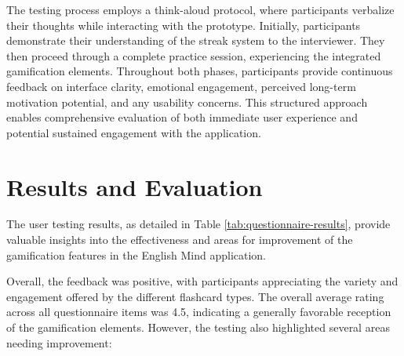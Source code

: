 The testing process employs a think-aloud protocol, where participants verbalize their thoughts while interacting with the prototype. Initially, participants demonstrate their understanding of the streak system to the interviewer. They then proceed through a complete practice session, experiencing the integrated gamification elements. Throughout both phases, participants provide continuous feedback on interface clarity, emotional engagement, perceived long-term motivation potential, and any usability concerns. This structured approach enables comprehensive evaluation of both immediate user experience and potential sustained engagement with the application.

\newpage

\section{Results and Evaluation}

The user testing results, as detailed in Table \ref{tab:questionnaire-results}, provide valuable insights into the effectiveness and areas for improvement of the gamification features in the English Mind application.

Overall, the feedback was positive, with participants appreciating the variety and engagement offered by the different flashcard types. The overall average rating across all questionnaire items was 4.5, indicating a generally favorable reception of the gamification elements. However, the testing also highlighted several areas needing improvement:

